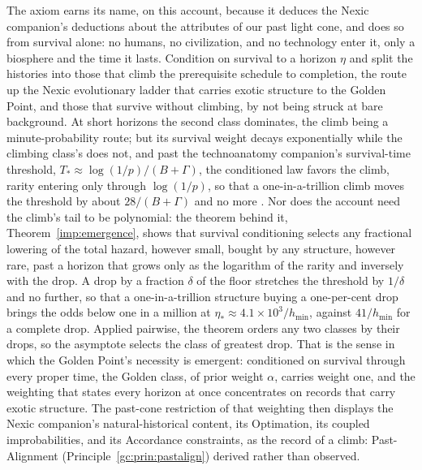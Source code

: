 \begin{remark}\label{gc:rem:axiomgolden}
The axiom earns its name, on this account, because it deduces
the Nexic companion's deductions about the attributes of our past light
cone, and does so from survival alone: no humans, no civilization, and
no technology enter it, only a biosphere and the time it lasts. Condition
on survival to a horizon $\eta$ and split the histories into those that
climb the prerequisite schedule to completion, the route up the Nexic
evolutionary ladder that carries exotic structure to the Golden Point,
and those that survive without climbing, by not being struck at bare
background. At short horizons the second class dominates, the climb
being a minute-probability route; but its survival weight decays
exponentially while the climbing class's does not, and past the
technoanatomy companion's survival-time threshold,
$T_\ast\approx\log(1/p)/(B+\Gamma)$, the conditioned law favors the
climb, rarity entering only through $\log(1/p)$, so that a
one-in-a-trillion climb moves the threshold by about $28/(B+\Gamma)$ and
no more \cite{GoldenTechnoanatomy}. Nor does the account need the
climb's tail to be polynomial: the theorem behind it,
Theorem~\ref{imp:emergence}, shows that survival conditioning selects any
fractional lowering of the total hazard, however small, bought by any
structure, however rare, past a horizon that grows only as the logarithm
of the rarity and inversely with the drop. A drop by a fraction $\delta$
of the floor stretches the threshold by $1/\delta$ and no further, so
that a one-in-a-trillion structure buying a one-per-cent drop brings the
odds below one in a million at $\eta_\ast\approx4.1\times10^{3}/h_{\min}$,
against $41/h_{\min}$ for a complete drop. Applied pairwise, the theorem
orders any two classes by their drops, so the asymptote selects the
class of greatest drop. That is the sense in which the Golden Point's
necessity is emergent: conditioned on survival through every proper
time, the Golden class, of prior weight $\alpha$, carries weight one, and
the weighting that states every horizon at once concentrates on records
that carry exotic structure. The past-cone restriction of that weighting
then displays the Nexic companion's natural-historical content, its
Optimation, its coupled improbabilities, and its Accordance constraints,
as the record of a climb: Past-Alignment
(Principle~\ref{gc:prin:pastalign}) derived rather than observed.


\end{remark}
